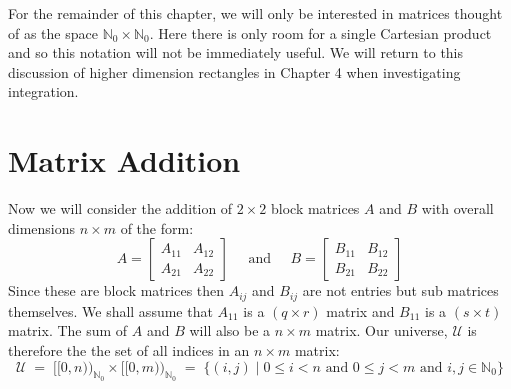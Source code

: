 For the remainder of this chapter, we will only be interested in matrices thought of as the space 
$\mathbb{N}_0 \times \mathbb{N}_0$.
Here there is only room for a single Cartesian product and so this notation will not be immediately useful. 
We will return to this discussion of higher dimension rectangles in Chapter 4 when investigating integration.




\section{Matrix Addition}


Now we will consider the addition of $2 \times 2$ block matrices $A$ and $B$ with overall dimensions $n \times m$ 
of the form:
\begin{equation*}
	A = \left[ \begin{array}{c|c} A_{11} & A_{12} \\ \hline A_{21} & A_{22} \end{array} \right]
	\;\;\;\;\; \text{and} \;\;\;\;\;
	B = \left[ \begin{array}{c|c} B_{11} & B_{12} \\ \hline B_{21} & B_{22} \end{array} \right]
\end{equation*}
Since these are block matrices then $A_{ij}$ and $B_{ij}$ are not entries but sub matrices themselves.
We shall assume that $A_{11}$ is a $(q \times r)$ matrix and $B_{11}$ is a $(s \times t)$ matrix.
The sum of $A$ and $B$ will also be a $n \times m$ matrix.
Our universe, $\mathcal{U}$ is therefore the the set of all indices in an $n \times m$ matrix:
\begin{equation*}
	\mathcal{U} 
		\;=\; [\![0,n)\!)_{\mathbb{N}_0} \times [\![0,m)\!)_{\mathbb{N}_0} 
		\;=\; \{ (i,j) \;|\; 0 \leq i < n \text{ and } 0 \leq j < m \text{ and } i,j \in \mathbb{N}_0 \} 
\end{equation*}


